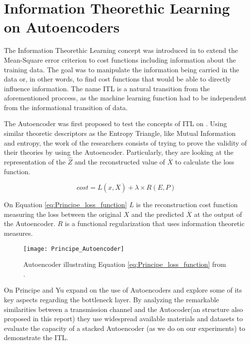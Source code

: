 \label{chap:StateArt}
\section{Information Theorethic Learning on Autoencoders}

The Information Theorethic Learning concept was introduced in \cite{Principe_2000} to extend the Mean-Square error criterion to cost functions including information about the training data. The goal was to manipulate the information being carried in the data or, in other words, to find cost functions that would be able to directly influence information. The name ITL is a natural transition from the aforementioned proccess, as the machine learning function had to be independent from the informational transition of data. \par

The Autoencoder was first proposed to test the concepts of ITL on \cite{Santana_2016}. Using similar theoretic descriptors as the Entropy Triangle, like Mutual Information and entropy, the work of the researchers consists of trying to prove the validity of their theories by using the Autoencoder. Particularly, they are looking at the representation of the $\hat{Z}$ and the reconstructed value of $\overline{X}$ to calculate the loss function.

\begin{equation}\label{eq:Principe_loss_function}
cost = L(x,\overline{X}) + \lambda \times R(E,P)
\end{equation}

On Equation \ref{eq:Principe_loss_function} $L$ is the reconstruction cost function measuring the loss between the original $X$ and the predicted $\overline{X}$ at the output of the Autoencoder. $R$ is a functional regularization that uses information theoretic measures.\par

\begin{figure}[H]
	\centering	
	\texttt{[image: Principe\_Autoencoder]}
	\caption{Autoencoder illustrating Equation \ref{eq:Principe_loss_function} from \cite{Santana_2016}.}
	\label{fig:figure_autoencoder}
\end{figure} 

On \cite{Yu_2019} Principe and Yu expand on the use of Autoencoders and explore some of its key aspects regarding the bottleneck layer. By analyzing the remarkable similarities between a transmission channel and the Autocoder(an structure also proposed in this report) they use widespread available materials and datasets to evaluate the capacity of a stacked Autoencoder (as we do on our experiments) to demonstrate the ITL. 


